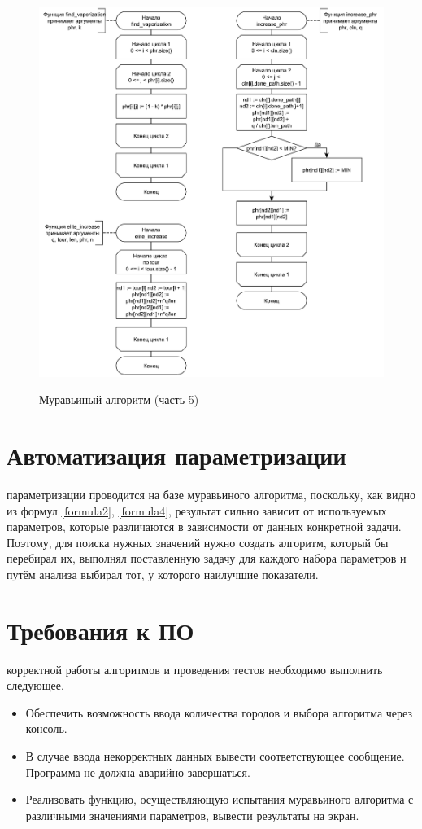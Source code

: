 \begin{figure}[h]
	\begin{center}
		{\includegraphics[scale = 0.6]{schemes/ant5}}
		\caption{Муравьиный алгоритм (часть 5)}
		\label{fig7:image}
	\end{center}
\end{figure}

\section{Автоматизация параметризации}
 параметризации проводится на базе муравьиного алгоритма, поскольку, как видно из формул \ref{formula2}, \ref{formula4}, результат сильно зависит от используемых параметров, которые различаются в зависимости от данных конкретной задачи. Поэтому, для поиска нужных значений нужно создать алгоритм, который бы перебирал их, выполнял поставленную задачу для каждого набора параметров и путём анализа выбирал тот, у которого наилучшие показатели.

\section{Требования к ПО}
 корректной работы алгоритмов и проведения тестов необходимо выполнить следующее.
\begin{itemize}
	\item Обеспечить возможность ввода количества городов и выбора алгоритма через консоль.
	\item В случае ввода некорректных данных вывести соответствующее сообщение. Программа не должна аварийно завершаться.
	\item Реализовать функцию, осуществляющую испытания муравьиного алгоритма с различными значениями параметров, вывести результаты на экран.
\end{itemize}

